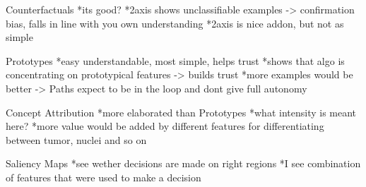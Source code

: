 Counterfactuals
*its good?
*2axis shows unclassifiable examples -> confirmation bias, falls in line with you own understanding
*2axis is nice addon, but not as simple

Prototypes
*easy understandable, most simple, helps trust
*shows that algo is concentrating on prototypical features -> builds trust
*more examples would be better -> Paths expect to be in the loop and dont give full autonomy

Concept Attribution
*more elaborated than Prototypes
*what intensity is meant here?
*more value would be added by different features for differentiating between tumor, nuclei and so on

Saliency Maps
*see wether decisions are made on right regions
*I see combination of features that were used to make a decision
